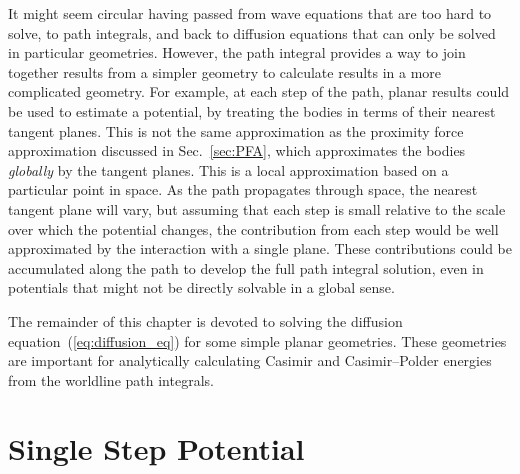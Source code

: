 It might seem circular having passed from wave equations that are too hard to solve, to path integrals,
and back to diffusion equations that can only be solved in particular geometries.
However, the path integral provides a way to join together results from a simpler geometry to calculate
results in a more complicated geometry.
For example, at each step of the path, planar results could be used to estimate a potential,
by treating the bodies in terms of their nearest tangent planes.  
This is not the same approximation as the proximity force approximation discussed in Sec.~\ref{sec:PFA}, 
which approximates the bodies \emph{globally} by the tangent planes. 
This is a local approximation based on a particular point in space.
As the path propagates through space, the nearest tangent plane will vary, but assuming that each 
step is small relative to the scale over which the potential changes,
 the contribution from each step would be well approximated by the interaction with a single plane. 
These contributions could be accumulated along the path to develop the full path integral solution,
 even in potentials that might not be directly solvable in a global sense.  


The remainder of this chapter is devoted to solving the diffusion equation~(\ref{eq:diffusion_eq})
for some simple planar geometries.
These geometries are important for analytically calculating Casimir and Casimir--Polder
energies from the worldline path integrals.  
    
\section{Single Step Potential}

